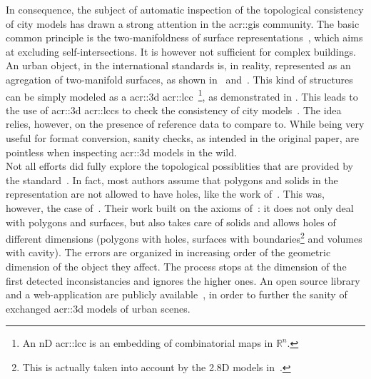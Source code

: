         In consequence, the subject of automatic inspection of the topological consistency of city models has drawn a strong attention in the \gls{acr::gis} community.
        The basic common principle is the two-manifoldness of surface representations~\parencite{groger2011achieve}, which aims at excluding self-intersections.
        It is however not sufficient for complex buildings.
        An urban object, in the international standards is, in reality, represented as an agregation of two-manifold surfaces, as shown in~\parencite{groger2011achieve} and~\parencite{ledoux2013validation}.
        This kind of structures can be simply modeled as a \gls{acr::3d} \gls{acr::lcc}~\parencite{damiand2014combinatorial}\footnote{
            An nD \gls{acr::lcc} is an embedding of combinatorial maps in \(\mathbb{R}^n\).
        }, as demonstrated in \textcite{diakite2014topological}.
        This leads to the use of \gls{acr::3d} \glspl{acr::lcc} to check the consistency of city models~\parencite{gorszczyk2016automatic}.
        The idea relies, however, on the presence of reference data to compare to.
        While being very useful for format conversion, sanity checks, as intended in the original paper, are pointless when inspecting \gls{acr::3d} models in the wild.\\
        Not all efforts did fully explore the topological possiblities that are provided by the standard~\parencite{ledoux2013validation,biljecki2016most}.
        In fact, most authors assume that polygons and solids in the representation are not allowed to have holes, like the work of~\textcite{groger2011achieve, alam2014towards}.
        This was, however, the case of~\textcite{ledoux2013validation}.
        Their work built on the axioms of~\textcite{groger2011achieve}: it does not only deal with polygons and surfaces, but also takes care of solids and allows holes of different dimensions (polygons with holes, surfaces with boundaries\footnote{
            This is actually taken into account by the 2.8D models in~\parencite{groger2011achieve}.
        } and volumes with cavity).
        The errors are organized in increasing order of the geometric dimension of the object they affect.
        The process stops at the dimension of the first detected inconsistancies and ignores the higher ones. 
        An open source library and a web-application are publicly available~\parencite{ledoux2018val3dity}, in order to further the sanity of exchanged \gls{acr::3d} models of urban scenes.\\


